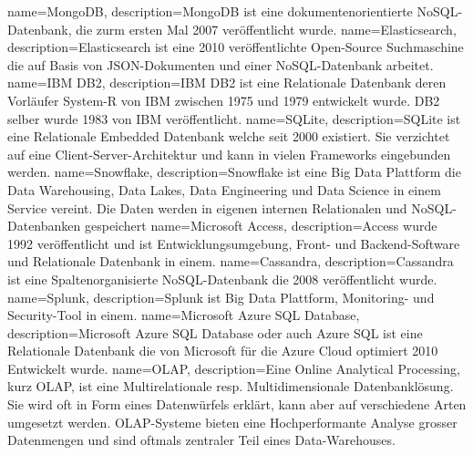 {
        name=MongoDB,
        description={MongoDB ist eine dokumentenorientierte \Gls{NoSQL}-Datenbank, die zurm ersten Mal 2007 veröffentlicht wurde\cite{YCYFBRLE}.}
}
{
        name=Elasticsearch,
        description={Elasticsearch ist eine 2010 veröffentlichte Open-Source Suchmaschine die auf Basis von JSON-Dokumenten und einer \Gls{NoSQL}-Datenbank arbeitet\cite{LUHWDIWV}.}
}
{
        name=IBM DB2,
        description={IBM DB2 ist eine Relationale Datenbank\cite{DJX54K3M} deren Vorläufer System-R von IBM zwischen 1975 und 1979 entwickelt wurde.
DB2 selber wurde 1983 von IBM veröffentlicht.}
}
{
        name=SQLite,
        description={SQLite ist eine Relationale Embedded Datenbank welche seit 2000 existiert.
Sie verzichtet auf eine Client-Server-Architektur und kann in vielen Frameworks eingebunden werden\cite{JCLXWZSR}.}
}
{
        name=Snowflake,
        description={Snowflake ist eine Big Data Plattform die Data Warehousing, Data Lakes, Data Engineering und Data Science in einem Service vereint.
Die Daten werden in eigenen internen Relationalen und \Gls{NoSQL}-Datenbanken gespeichert\cite{QCM8CD5A,7VWNV2V4}}
}
{
        name=Microsoft Access,
        description={Access wurde 1992 veröffentlicht und ist Entwicklungsumgebung, Front- und Backend-Software und Relationale Datenbank in einem\cite{44L9YDSR}.}
}
{
        name=Cassandra,
        description={Cassandra ist eine Spaltenorganisierte \Gls{NoSQL}-Datenbank die 2008 veröffentlicht\cite{KA934RSV} wurde.}
}
{
        name=Splunk,
        description={Splunk ist Big Data Plattform, Monitoring- und Security-Tool in einem\cite{GUPY8F7E, PH3HQUCR}.
}
}
{
        name=Microsoft Azure SQL Database,
        description={Microsoft Azure SQL Database oder auch Azure SQL ist eine Relationale Datenbank die von Microsoft für die Azure Cloud optimiert 2010 Entwickelt wurde\cite{QVZZTCG6}.}
}
{
        name=OLAP,
        description={Eine Online Analytical Processing, kurz OLAP, ist eine Multirelationale resp.
        Multidimensionale Datenbanklösung.
Sie wird oft in Form eines Datenwürfels erklärt, kann aber auf verschiedene Arten umgesetzt werden\cite{W5LMN5ZM, 5D3IPPGJ}.
OLAP-Systeme bieten eine Hochperformante Analyse grosser Datenmengen und sind oftmals zentraler Teil eines Data-Warehouses.}
}
